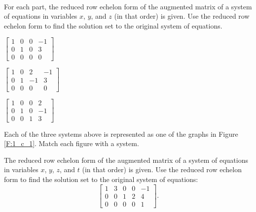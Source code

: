 \begin{activity} \label{act:1_c_4} ~
\ba
\item For each part, the reduced row echelon form of the augmented matrix of a system of equations in variables $x$, $y$, and $z$ (in that order) is given. Use the reduced row echelon form to find the solution set to the original system of equations.
	\begin{enumerate}[i.]
	\begin{minipage}{1.4in}
	\item $\left[ \begin{array}{ccc|r} 1 & 0 & 0 & -1 \\ 0 & 1 & 0 & 3 \\ 0 & 0 & 0 & 0 \end{array} \right]$ %
	\end{minipage}
	\begin{minipage}{1.55in}
	\item $\left[ \begin{array}{ccr|r} 1 & 0 & 2 & -1 \\ 0 & 1 & -1 & 3 \\ 0 & 0 & 0 & 0 \end{array} \right]$ %
	\end{minipage}
	\begin{minipage}{1.4in}
	\item $\left[ \begin{array}{ccc|r} 1 & 0 & 0 & 2 \\ 0 & 1 & 0 & -1 \\ 0 & 0 & 1 & 3 \end{array} \right]$ %
	\end{minipage}

\item Each of the three systems above is represented as one of the graphs in Figure \ref{F:1_c_1}. Match each figure with a system.

	\end{enumerate}
	
\item The reduced row echelon form of the augmented matrix of a system of equations in variables $x$, $y$, $z$, and $t$ (in that order) is given. Use the reduced row echelon form to find the solution set to the original system of equations:  
\[\left[ \begin{array}{cccc|r} 1 & 3 & 0 & 0 & -1 \\ 0 & 0 & 1 & 2 & 4 \\ 0 & 0 & 0 & 0 & 1 \end{array} \right].\]



\ea

\end{activity}





